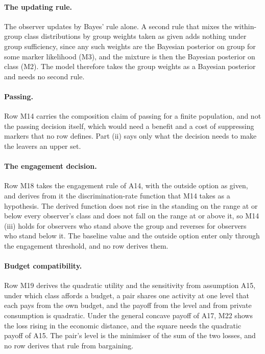 \paragraph{The updating rule.} The observer updates by Bayes' rule alone. A second
rule that mixes the within-group class distributions by group weights taken
as given adds nothing under group sufficiency, since any such weights are the
Bayesian posterior on group for some marker likelihood (M3), and the mixture
is then the Bayesian posterior on class (M2). The model therefore takes the
group weights as a Bayesian posterior and needs no second rule.

\paragraph{Passing.} Row M14 carries the composition claim of passing
for a finite population, and not the passing decision itself, which would
need a benefit and a cost of suppressing markers that no row defines. Part (ii) says only
what the decision needs to make the leavers an upper set.

\paragraph{The engagement decision.} Row M18 takes the engagement rule
of A14, with the outside option as given, and
derives from it the discrimination-rate function that M14 takes as a
hypothesis. The derived function does not rise in the standing on the range
at or below every observer's class and does not fall on the range at or
above it, so M14 (iii) holds for observers who stand above the group and
reverses for observers who stand below it. The baseline value and the
outside option enter only through the engagement threshold, and no row
derives them.

\paragraph{Budget compatibility.} Row M19 derives the quadratic utility and
the sensitivity from assumption A15, under which class affords a budget, a
pair shares one activity at one level that each pays from the own budget,
and the payoff from the level and from private consumption is quadratic.
Under the general concave payoff of A17, M22 shows the loss rising in the
economic distance, and the square needs the quadratic payoff of A15. The pair's level is the minimiser of the
sum of the two losses, and no row derives that rule from bargaining.

